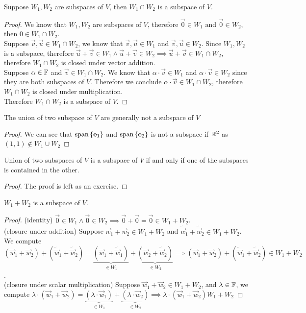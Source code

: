 \begin{theorem}
    Suppose $W_1,W_2$ are subspaces of $V$, then $W_1 \cap W_2$ is a subspace of $V$.
\end{theorem}
\begin{proof}
    We know that $W_1,W_2$ are subspaces of $V$, therefore $\vec 0 \in W_1$ and $\vec 0 \in W_2$, then $0 \in W_1 \cap W_2$. \\
    Suppose $\vec v,\vec u \in W_1 \cap W_2$, we know that $\vec v,\vec u \in W_1$ and $\vec v, \vec u \in W_2$. Since $W_1,W_2$ is a subspace, therefore $\vec u + \vec v \in W_1 \land \vec u + \vec v \in W_2 \implies \vec u + \vec v \in W_1 \cap W_2$, therefore $W_1 \cap W_2$ is closed under vector addition. \\ 
    Suppose $\alpha \in \mathbb F$ and $\vec v \in W_1 \cap W_2$. We know that $\alpha \cdot \vec v \in W_1$ and $\alpha \cdot \vec v \in W_2$ since they are both subspaces of $V$. Therefore we conclude $\alpha \cdot \vec v \in W_1 \cap W_2$, therefore $W_1 \cap W_2$ is closed under multiplication. \\
    Therefore $W_1 \cap W_2$ is a subspace of $V$.
\end{proof}
\begin{proposition}
    The union of two subspace of $V$ are generally not a subspace of $V$
\end{proposition}
\begin{proof}
    We can see that $\text{span} \left\{ \mathbf e_1 \right\}$ and $\text{span} \left\{ \mathbf e_2 \right\}$ is not a subspace if $\mathbb R^2$ as $(1,1) \not\in W_1 \cup W_2$ 
\end{proof}
\begin{theorem}
    Union of two subspaces of $V$ is a subspace of $V$ if and only if one of the subspaces is contained in the other.
\end{theorem}
\begin{proof}
    The proof is left as an exercise.
\end{proof}
\begin{theorem}
    $W_1 + W_2$ is a subspace of $V$.
\end{theorem}
\begin{proof}
    (identity) $\vec 0 \in W_1 \land \vec 0 \in W_2 \implies \vec 0 + \vec 0 = \vec 0 \in W_1 + W_2$. \\
    (closure under addition) Suppose $\vec w_1 + \vec w_2 \in W_1 + W_2$ and $\tilde{\vec w}_1 + \tilde{\vec w}_2 \in W_1 + W_2$. We compute $(\vec w_1 + \vec w_2) + (\tilde{\vec w}_1 + \tilde {\vec w}_2) = \underbrace{(\vec w_1 + \tilde{\vec w}_1)}_{\in W_1} + \underbrace{(\vec w_2 + \tilde{\vec w}_2)}_{\in W_2} \implies (\vec w_1 + \vec w_2) + (\tilde{\vec w}_1 + \tilde{\vec w}_2) \in W_1 + W_2$. \\

    (closure under scalar multiplication) Suppose $\vec w_1 + \vec w_2 \in W_1 + W_2$, and $\lambda \in \mathbb F$, we compute $\lambda \cdot (\vec w_1 + \vec w_2)  = \underbrace{(\lambda \cdot \vec w_1)}_{\in W_1} + \underbrace{(\lambda \cdot \vec w_2)}_{\in W_2} \implies \lambda \cdot (\vec w_1 + \vec w_2) W_1 + W_2$
\end{proof}
